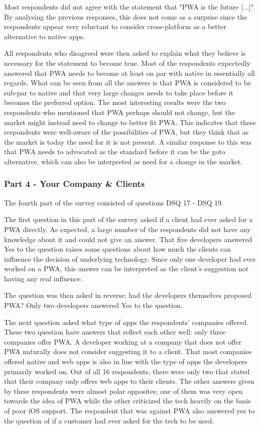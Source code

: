 \documentclass[a4paper,12pt]{article}
\begin{document}
Most respondents did not agree with the statement that "PWA is the future [...]". By analysing the previous responses, this does not come as a surprise since the respondents appear very reluctant to consider cross-platform as a better alternative to native apps.

All respondents who disagreed were then asked to explain what they believe is necessary for the statement to become true. Most of the respondents expectedly answered that PWA needs to become at least on par with native in essentially all regards. What can be seen from all the answers is that PWA is considered to be sub-par to native and that very large changes needs to take place before it becomes the preferred option. The most interesting results were the two respondents who mentioned that PWA perhaps should not change, but the market might instead need to change to better fit PWA. This indicates that these respondents were well-aware of the possibilities of PWA, but they think that as the market is today the need for it is not present. A similar response to this was that PWA needs to advocated as the standard before it can be the goto alternative, which can also be interpreted as need for a change in the market.

\subsubsection{Part 4 - Your Company \& Clients}
\label{Analysis_devSurvey_part4}
The fourth part of the survey consisted of questions DSQ 17 - DSQ 19.

The first question in this part of the survey asked if a client had ever asked for a PWA directly. As expected, a large number of the respondents did not have any knowledge about it and could not give an answer. That five developers answered Yes to the question raises some questions about how much the clients can influence the decision of underlying technology. Since only one developer had ever worked on a PWA, this answer can be interpreted as the client's suggestion not having any real influence.

The question was then asked in reverse; had the developers themselves proposed PWA? Only two developers answered Yes to the question.

The next question asked what type of apps the respondents' companies offered. These two question have answers that reflect each other well: only three companies offer PWA. A developer working at a company that does not offer PWA naturally does not consider suggesting it to a client. That most companies offered native and web apps is also in line with the type of apps the developers primarily worked on. Out of all 16 respondents, there were only two that stated that their company only offers web apps to their clients. The other answers given by these respondents were almost polar opposites; one of them was very open towards the idea of PWA while the other criticized the tech heavily on the basis of poor iOS support. The respondent that was against PWA also answered yes to the question of if a customer had ever asked for the tech to be used.
\end{document}
